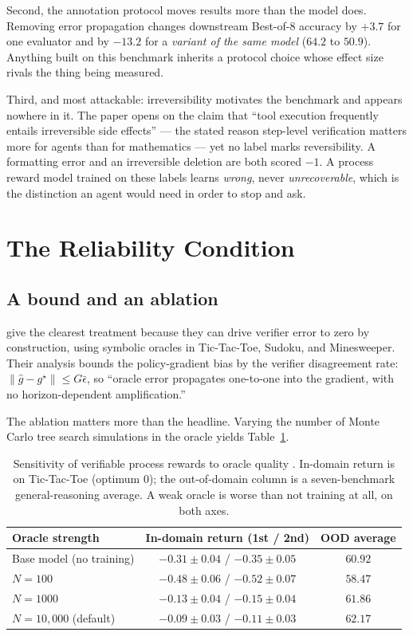 \documentclass[10pt,twocolumn,a4paper]{article}
\newcommand{\ebar}{\bar{\epsilon}}
\begin{document}
Second, the annotation protocol moves results more than the model does.
Removing error propagation changes downstream Best-of-8 accuracy by $+3.7$ for one
evaluator and by $-13.2$ for a \emph{variant of the same model} ($64.2$ to $50.9$).
Anything built on this benchmark inherits a protocol choice whose effect size rivals the
thing being measured.

Third, and most attackable: irreversibility motivates the benchmark and appears nowhere in
it.
The paper opens on the claim that ``tool execution frequently entails irreversible side
effects'' --- the stated reason step-level verification matters more for agents than for
mathematics --- yet no label marks reversibility.
A formatting error and an irreversible deletion are both scored $-1$.
A process reward model trained on these labels learns \emph{wrong}, never
\emph{unrecoverable}, which is the distinction an agent would need in order to stop and ask.

\section{The Reliability Condition}
\label{sec:condition}

\subsection{A bound and an ablation}

\citet{yuan2026verifiableprocessrewardsagentic} give the clearest treatment because they
can drive verifier error to zero by construction, using symbolic oracles in Tic-Tac-Toe,
Sudoku, and Minesweeper.
Their analysis bounds the policy-gradient bias by the verifier disagreement rate:
$\lVert \hat{g} - g^{\star} \rVert \le G\ebar$, so ``oracle error propagates one-to-one
into the gradient, with no horizon-dependent amplification.''

The ablation matters more than the headline.
Varying the number of Monte Carlo tree search simulations in the oracle yields
Table~\ref{tab:oracle}.

\begin{table}[t]
\centering
\begin{tabular}{lcc}
\toprule
Oracle strength & In-domain return (1st / 2nd) & OOD average \\
\midrule
Base model (no training) & $-0.31 \pm 0.04$ / $-0.35 \pm 0.05$ & $60.92$ \\
$N = 100$                & $-0.48 \pm 0.06$ / $-0.52 \pm 0.07$ & $58.47$ \\
$N = 1000$               & $-0.13 \pm 0.04$ / $-0.15 \pm 0.04$ & $61.86$ \\
$N = 10{,}000$ (default) & $-0.09 \pm 0.03$ / $-0.11 \pm 0.03$ & $62.17$ \\
\bottomrule
\end{tabular}
\caption{Sensitivity of verifiable process rewards to oracle quality
\citep{yuan2026verifiableprocessrewardsagentic}.
In-domain return is on Tic-Tac-Toe (optimum $0$); the out-of-domain column is a
seven-benchmark general-reasoning average.
A weak oracle is worse than not training at all, on both axes.}
\label{tab:oracle}
\end{table}
\end{document}
